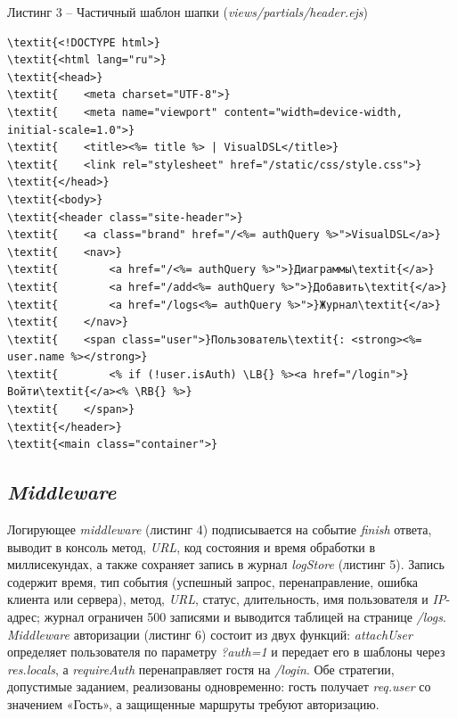 \documentclass[14pt,a4paper]{extarticle}
\newcommand{\LB}{\char123}
\newcommand{\RB}{\char125}
\begin{document}
\noindent\vspace{18pt}\par\nopagebreak\noindent Листинг 3 – Частичный шаблон шапки (\textit{views/partials/header.ejs})\par\nopagebreak
\begin{Verbatim}[commandchars=\\\{\},fontsize=\small,baselinestretch=1]
\textit{<!DOCTYPE html>}
\textit{<html lang="ru">}
\textit{<head>}
\textit{    <meta charset="UTF-8">}
\textit{    <meta name="viewport" content="width=device-width, initial-scale=1.0">}
\textit{    <title><%= title %> | VisualDSL</title>}
\textit{    <link rel="stylesheet" href="/static/css/style.css">}
\textit{</head>}
\textit{<body>}
\textit{<header class="site-header">}
\textit{    <a class="brand" href="/<%= authQuery %>">VisualDSL</a>}
\textit{    <nav>}
\textit{        <a href="/<%= authQuery %>">}Диаграммы\textit{</a>}
\textit{        <a href="/add<%= authQuery %>">}Добавить\textit{</a>}
\textit{        <a href="/logs<%= authQuery %>">}Журнал\textit{</a>}
\textit{    </nav>}
\textit{    <span class="user">}Пользователь\textit{: <strong><%= user.name %></strong>}
\textit{        <% if (!user.isAuth) \LB{} %><a href="/login">}Войти\textit{</a><% \RB{} %>}
\textit{    </span>}
\textit{</header>}
\textit{<main class="container">}
\end{Verbatim}
\vspace{18pt}

\subsection{\textit{Middleware}}

Логирующее \textit{middleware} (листинг 4) подписывается на событие \textit{finish} ответа, выводит в консоль метод, \textit{URL}, код состояния и время обработки в миллисекундах, а также сохраняет запись в журнал \textit{logStore} (листинг 5). Запись содержит время, тип события (успешный запрос, перенаправление, ошибка клиента или сервера), метод, \textit{URL}, статус, длительность, имя пользователя и \textit{IP}-адрес; журнал ограничен 500 записями и выводится таблицей на странице \textit{/logs}. \textit{Middleware} авторизации (листинг 6) состоит из двух функций: \textit{attachUser} определяет пользователя по параметру \textit{?auth=1} и передает его в шаблоны через \textit{res.locals}, а \textit{requireAuth} перенаправляет гостя на \textit{/login}. Обе стратегии, допустимые заданием, реализованы одновременно: гость получает \textit{req.user} со значением «Гость», а защищенные маршруты требуют авторизацию.
\end{document}
